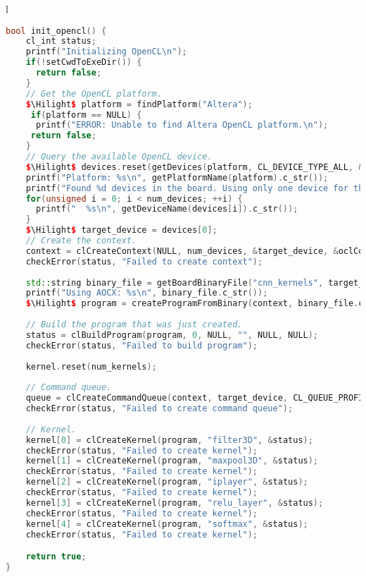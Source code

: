 \begin{table}[!h]
\centering
\caption{Initialization of OpenCL Objects for Altera FPGA (Taken from Altera Design Examples)}
\label{cnncode3:altera-opencl-init}
\begin{tabular}{l}
\toprule
\begin{lstlisting}[columns=fullflexible, language=C++, escapechar=\$]
bool init_opencl() {
	cl_int status;	
	printf("Initializing OpenCL\n");
	if(!setCwdToExeDir()) {
	  return false;
	}	
	// Get the OpenCL platform.
	$\Hilight$ platform = findPlatform("Altera");
	 if(platform == NULL) {
	  printf("ERROR: Unable to find Altera OpenCL platform.\n");
	 return false;
	}	
	// Query the available OpenCL device.
	$\Hilight$ devices.reset(getDevices(platform, CL_DEVICE_TYPE_ALL, &num_devices));
	printf("Platform: %s\n", getPlatformName(platform).c_str());
	printf("Found %d devices in the board. Using only one device for this app\n", num_devices);
	for(unsigned i = 0; i < num_devices; ++i) {
	  printf("  %s\n", getDeviceName(devices[i]).c_str());
	}
	$\Hilight$ target_device = devices[0];	
	// Create the context.
	context = clCreateContext(NULL, num_devices, &target_device, &oclContextCallback, NULL, &status);
	checkError(status, "Failed to create context");
	
	std::string binary_file = getBoardBinaryFile("cnn_kernels", target_device);
	printf("Using AOCX: %s\n", binary_file.c_str());
	$\Hilight$ program = createProgramFromBinary(context, binary_file.c_str(), &target_device, num_devices);
	
	// Build the program that was just created.
	status = clBuildProgram(program, 0, NULL, "", NULL, NULL);
	checkError(status, "Failed to build program");
	
	kernel.reset(num_kernels);
	
	// Command queue.
	queue = clCreateCommandQueue(context, target_device, CL_QUEUE_PROFILING_ENABLE, &status);
	checkError(status, "Failed to create command queue");
	
	// Kernel.
	kernel[0] = clCreateKernel(program, "filter3D", &status);
	checkError(status, "Failed to create kernel");
	kernel[1] = clCreateKernel(program, "maxpool3D", &status);
	checkError(status, "Failed to create kernel");
	kernel[2] = clCreateKernel(program, "iplayer", &status);
	checkError(status, "Failed to create kernel");
	kernel[3] = clCreateKernel(program, "relu_layer", &status);
	checkError(status, "Failed to create kernel");
	kernel[4] = clCreateKernel(program, "softmax", &status);
	checkError(status, "Failed to create kernel");

	return true;
}
\end{lstlisting}
\\
\bottomrule
\end{tabular}
\end{table}

